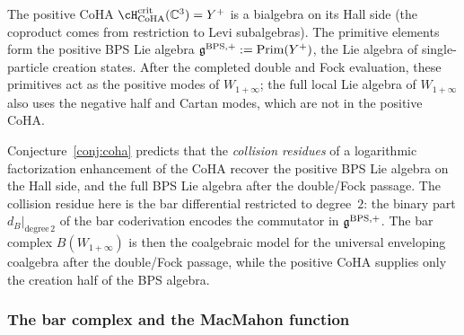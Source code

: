 \begin{remark}
\label{rem:coha-primitive-lie}
The positive CoHA $\cH_{\mathrm{CoHA}}^{\mathrm{crit}}(\CC^3)=Y^+$ is a
bialgebra on its Hall side (the coproduct comes from restriction to
Levi subalgebras). The primitive elements form the positive BPS Lie
algebra
$\mathfrak{g}^{\mathrm{BPS},+}:=\mathrm{Prim}(Y^+)$, the Lie algebra of
single-particle creation states. After the completed double and Fock
evaluation, these primitives act as the positive modes of
$W_{1+\infty}$; the full local Lie algebra of $W_{1+\infty}$ also uses
the negative half and Cartan modes, which are not in the positive CoHA.

Conjecture~\ref{conj:coha} predicts that the \emph{collision residues}
of a logarithmic factorization enhancement of the CoHA recover the
positive BPS Lie algebra on the Hall side, and the full BPS Lie algebra
after the double/Fock passage. The collision residue here is the bar
differential restricted to degree~$2$: the binary part $d_B|_{\mathrm{degree}\,2}$
of the bar coderivation encodes the commutator in $\mathfrak{g}^{\mathrm{BPS},+}$.
The bar complex $B(W_{1+\infty})$ is then the coalgebraic model for
the universal enveloping coalgebra after the double/Fock passage,
while the positive CoHA supplies only the creation half of the BPS
algebra.
\end{remark}

\subsubsection{The bar complex and the MacMahon function}
\label{subsubsec:bar-macmahon}

